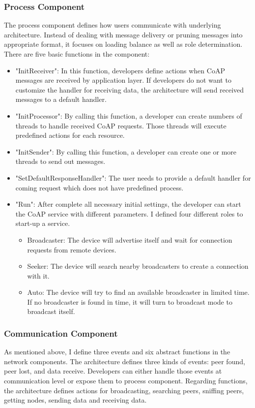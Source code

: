 \documentclass{Nan_Thesis}
\begin{document}
\subsubsection{Process Component}
The process component defines how users communicate with underlying architecture. Instead of dealing with message delivery or pruning messages into appropriate format, it focuses on loading balance as well as role determination. There are five basic functions in the component:

\begin{itemize}
  \item "InitReceiver": In this function, developers define actions when CoAP messages are received by application layer. If developers do not want to customize the handler for receiving data, the architecture will send received messages to a default handler.
  \item "InitProcessor": By calling this function, a developer can create numbers of threads to handle received CoAP requests. Those threads will execute predefined actions for each resource. 
  \item "InitSender": By calling this function, a developer can create one or more threads to send out messages.
  \item "SetDefaultResponseHandler": The user needs to provide a default handler for coming request which does not have predefined process.
  \item "Run": After complete all necessary initial settings, the developer can start the CoAP service with different parameters. I defined four different roles to start-up a service.
\begin{itemize}
\item Broadcaster: The device will advertise itself and wait for connection requests from remote devices. 
\item Seeker: The device will search nearby broadcasters to create a connection with it. 
\item Auto: The device will try to find an available broadcaster in limited time. If no broadcaster is found in time, it will turn to broadcast mode to broadcast itself.  
\end{itemize}
\end{itemize}

\subsubsection{Communication Component}
As mentioned above, I define three events and six abstract functions in the network components. The architecture defines three kinds of events: peer found, peer lost, and data receive. Developers can either handle those events at communication level or expose them to process component. Regarding functions, the architecture defines actions for broadcasting, searching peers, sniffing peers, getting nodes, sending data and receiving data.
\end{document}
